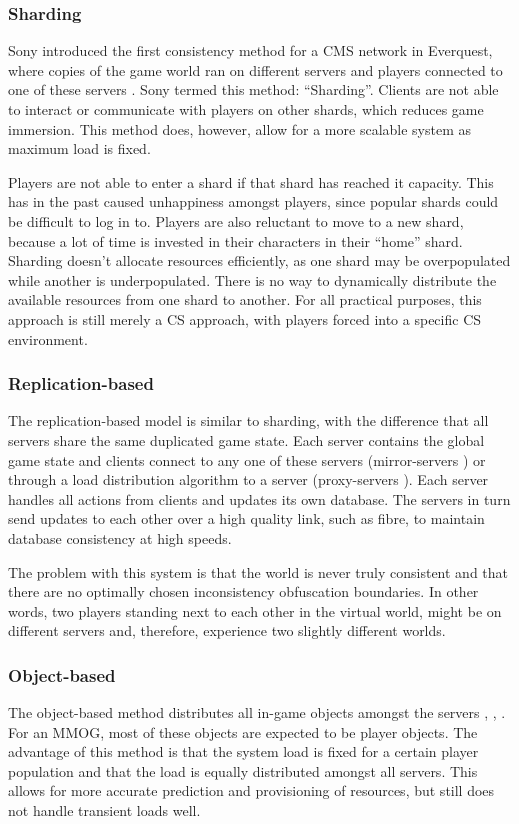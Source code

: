 \documentclass[10pt,a4paper,journal,cspaper,compsoc]{IEEEtran}
\begin{document}
\subsubsection{Sharding}
Sony introduced the first consistency method for a \ac{CMS} network in Everquest, where copies of the game world ran on different servers and players
connected to one of these servers \cite{engineering_everquest}. Sony termed this method: ``Sharding''. Clients are not able to interact or
communicate with players on other shards, which reduces game immersion. This method does, however, allow for a more scalable system as maximum load
is fixed.

Players are not able to enter a shard if that shard has reached it capacity. This has in the past caused unhappiness amongst players, since popular
shards could be difficult to log in to. Players are also reluctant to move to a new shard, because a lot of time is invested in their characters in
their ``home'' shard. Sharding doesn't allocate resources efficiently, as one shard may be overpopulated while another is underpopulated. There is no
way to dynamically distribute the available resources from one shard to another. For all practical purposes, this approach is still merely a \ac{CS}
approach, with players forced into a specific \ac{CS} environment.

\subsubsection{Replication-based}
The replication-based model is similar to sharding, with the difference that all servers share the same duplicated game state. Each server contains
the global game state and clients connect to any one of these servers (mirror-servers \cite{mirrored_server}) or through a load distribution
algorithm to a server (proxy-servers \cite{proxy_server_dist}). Each server handles all actions from clients and updates its own database. The
servers in turn send updates to each other over a high quality link, such as fibre, to maintain database consistency at high speeds.

The problem with this system is that the world is never truly consistent and that there are no optimally chosen inconsistency obfuscation boundaries.
In other words, two players standing next to each other in the virtual world, might be on different servers and, therefore, experience two slightly
different worlds.

\subsubsection{Object-based}
The object-based method distributes all in-game objects amongst the servers \cite{object_based_consistency1}, \cite{object_based_consistency2},
\cite{object_based_consistency3}. For an MMOG, most of these objects are expected to be player objects. The advantage of this method is that the
system load is fixed for a certain player population and that the load is equally distributed amongst all servers. This allows for more accurate
prediction and provisioning of resources, but still does not handle transient loads well.
\end{document}
